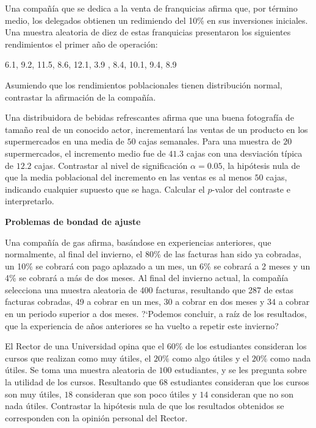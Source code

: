 \documentclass[12pt]{article}
\begin{document}
\begin{prob}
Una compañía que se dedica a la venta de franquicias afirma que, por término medio, los
delegados obtienen un redimiendo del 10\% en sus inversiones iniciales. Una muestra
aleatoria de diez de estas franquicias presentaron los siguientes rendimientos el primer
año de operación:

6.1, 9.2, 11.5, 8.6, 12.1, 3.9 , 8.4, 10.1, 9.4, 8.9

Asumiendo que los rendimientos poblacionales tienen distribución normal, contrastar la
afirmación de la compañía.
\end{prob}


\begin{prob}
Una distribuidora de bebidas refrescantes afirma que una buena fotografía de tamaño real de
un conocido actor, incrementará las ventas de un producto en los supermercados en una media
de $50$ cajas semanales. Para una muestra de $20$ supermercados, el incremento medio fue de
$41.3$ cajas con una desviación típica de $12.2$ cajas. Contrastar al nivel de
significación $\alpha=0.05$, la hipótesis nula de que la media poblacional del incremento
en las ventas es al menos $50$ cajas, indicando cualquier supuesto que se haga. Calcular el
$p$-valor del contraste e interpretarlo.
\end{prob}



\newpage



\textbf{Problemas de bondad de ajuste}
\begin{prob}
Una compañía de gas afirma, basándose en experiencias anteriores, que normalmente, al final
del invierno, el 80\% de las facturas han sido ya cobradas, un 10\% se cobrará con pago
aplazado a un mes, un 6\% se cobrará a 2 meses y un 4\% se cobrará a más de dos meses. Al
final del invierno actual, la compañía selecciona una muestra aleatoria de $400$ facturas,
resultando que 287 de estas facturas cobradas, 49 a cobrar en un mes, $30$ a cobrar en dos
meses y $34$ a cobrar en un periodo superior a dos meses. ?`Podemos concluir, a raíz de los
resultados, que la experiencia de años anteriores se ha vuelto a repetir este invierno?
\end{prob}

\begin{prob}
El Rector de una Universidad opina que el $60\%$ de los estudiantes consideran los cursos
que realizan como muy útiles, el $20\%$ como algo útiles y el $20\%$ como nada útiles. Se
toma una muestra aleatoria de $100$ estudiantes, y se les pregunta sobre la utilidad de los
cursos. Resultando que $68$ estudiantes consideran que los cursos son muy útiles, $18$
consideran que son poco útiles y $14$ consideran que no son nada útiles. Contrastar la
hipótesis nula de que los resultados obtenidos se corresponden con la opinión personal del
Rector.
\end{prob}
\end{document}
